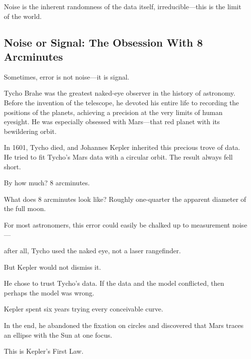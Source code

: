 Noise is the inherent randomness of the data itself, irreducible---this is the limit of the world.



\subsection{Noise or Signal: The Obsession With 8 Arcminutes}

Sometimes, error is not noise---it is signal.

Tycho Brahe was the greatest naked-eye observer in the history of astronomy. Before the invention of the telescope, he devoted his entire life to recording the positions of the planets, achieving a precision at the very limits of human eyesight. He was especially obsessed with Mars---that red planet with its bewildering orbit.

In 1601, Tycho died, and Johannes Kepler inherited this precious trove of data.
He tried to fit Tycho's Mars data with a circular orbit. The result always fell short.

\vspace{1em}

By how much? 8 arcminutes.

What does 8 arcminutes look like? Roughly one-quarter the apparent diameter of the full moon.

For most astronomers, this error could easily be chalked up to measurement noise---

after all, Tycho used the naked eye, not a laser rangefinder.

\vspace{1em}

But Kepler would not dismiss it.

He chose to trust Tycho's data. If the data and the model conflicted, then perhaps the model was wrong.

Kepler spent six years trying every conceivable curve.

In the end, he abandoned the fixation on circles and discovered that Mars traces an ellipse with the Sun at one focus.

\vspace{1em}

This is Kepler's First Law.


